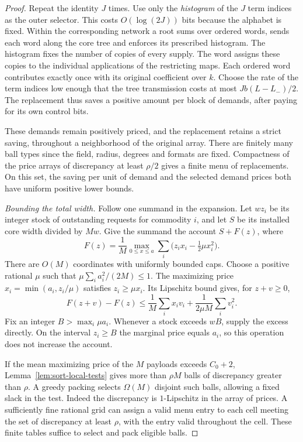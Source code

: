 \begin{proof}
Repeat the identity $J$ times. Use only the \emph{histogram} of the
$J$ term indices as the outer selector. This costs $O(\log(2J))$
bits because the alphabet is fixed. Within the corresponding network
a root sums over ordered words, sends each word along the core tree
and enforces its prescribed histogram. The histogram fixes the
number of copies of every supply. The word assigns these copies to
the individual applications of the restricting maps. Each ordered
word contributes exactly once with its original coefficient over
$k$. Choose the rate of the term indices low enough that the tree
transmission costs at most $Jb(L-L_-)/2$. The replacement thus saves
a positive amount per block of demands, after paying for its own
control bits.

These demands remain positively priced, and the replacement retains
a strict saving, throughout a neighborhood of the original array.
There are finitely many ball types since the field, radius, degrees
and formats are fixed. Compactness of the price arrays of discrepancy
at least $\rho/2$ gives a finite menu of replacements. On this set,
the saving per unit of demand and the selected demand prices both
have uniform positive lower bounds.

\smallskip\noindent
\emph{Bounding the total width.}
Follow one summand in the expansion. Let $wz_i$ be its integer stock
of outstanding requests for commodity $i$, and let $S$ be its
installed core width divided by $Mw$. Give the summand the account
$S+F(z)$, where
\[
       F(z)=\frac1M\max_{0\le x\le a}
                   \sum_i\bigl(z_ix_i-\tfrac12\mu x_i^2\bigr).
\]
There are $O(M)$ coordinates with uniformly bounded caps. Choose
a positive rational $\mu$ such that $\mu\sum_i a_i^2/(2M)\le1$.
The maximizing price $x_i=\min(a_i,z_i/\mu)$ satisfies
$z_i\ge\mu x_i$. Its Lipschitz bound gives, for $z+v\ge0$,
\[
       F(z+v)-F(z)
       \le \frac1M\sum_i x_iv_i+\frac1{2\mu M}\sum_i v_i^2 .
\]
Fix an integer $B>\max_i\mu a_i$. Whenever a stock exceeds $wB$,
supply the excess directly. On the interval $z_i\ge B$ the
marginal price equals $a_i$, so this operation does not increase
the account.

If the mean maximizing price of the $M$ payloads exceeds $C_0+2$,
Lemma~\ref{lem:sort-local-tests} gives more than $\rho M$ balls of
discrepancy greater than $\rho$. A greedy packing selects $\Omega(M)$
disjoint such balls, allowing a fixed slack in the test. Indeed the
discrepancy is $1$-Lipschitz in the array of prices. A sufficiently
fine rational grid can assign a valid menu entry to each cell meeting
the set of discrepancy at least $\rho$, with the entry valid throughout
the cell. These finite tables suffice to select and pack eligible balls.


\end{proof}
